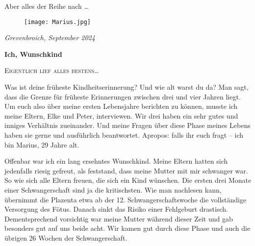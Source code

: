 \documentclass[fontsize=12pt,a4paper,headinclude,DIV=calc,automark]{scrbook}
\begin{document}
\noindent Aber alles der Reihe nach …

\begin{figure}[H]
    \raggedright
    \texttt{[image: Marius.jpg]}
\end{figure}
\noindent\small\textit{Grevenbroich, September 2024}


\mainmatter

\clearpairofpagestyles %
\lehead{\leftmark}     %
\rehead{\thepage}      %
\lohead{\thepage}      %
\rohead{\leftmark}     %

\pagestyle{scrheadings}

\thispagestyle{scrheadings} %

\leavevmode
\vspace*{0.5\baselineskip}
{\noindent\fontsize{18}{24}\bfseries Ich, Wunschkind\par}
{\noindent\fontsize{14}{20}\selectfont\scshape Eigentlich lief alles bestens\ldots\par}
\vspace*{0.5\baselineskip}
\normalsize

\noindent Was ist deine früheste Kindheitserinnerung? Und wie alt warst du da? Man sagt, dass die Grenze für früheste Erinnerungen zwischen drei und vier Jahren liegt. Um euch also über meine ersten Lebensjahre berichten zu können, musste ich meine Eltern, Elke und Peter, interviewen. Wir drei haben ein sehr gutes und inniges Verhältnis zueinander. Und meine Fragen über diese Phase meines Lebens haben sie gerne und ausführlich beantwortet. Apropos: falls ihr euch fragt – ich bin Marius, 29 Jahre alt.

Offenbar war ich ein lang ersehntes Wunschkind. Meine Eltern hatten sich jedenfalls riesig gefreut, als feststand, dass meine Mutter mit mir schwanger war. So wie sich alle Eltern freuen, die sich ein Kind wünschen. Die ersten drei Monate einer Schwangerschaft sind ja die kritischsten. Wie man nachlesen kann, übernimmt die Plazenta etwa ab der 12. Schwangerschaftswoche die vollständige Versorgung des Fötus. Danach sinkt das Risiko einer Fehlgeburt drastisch. Dementsprechend vorsichtig war meine Mutter während dieser Zeit und gab besonders gut auf uns beide acht. Wir kamen gut durch diese Phase und auch die übrigen 26 Wochen der Schwangerschaft.
\end{document}
